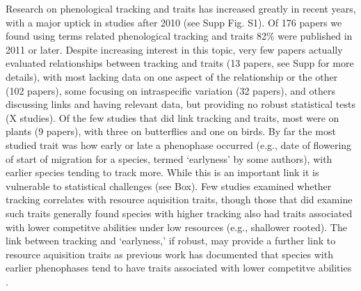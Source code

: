 \documentclass[11pt,letterpaper]{article}
\begin{document}
Research on phenological tracking and traits has increased greatly in recent years, with a major uptick in studies after 2010 (see Supp Fig. S1). Of 176 papers we found using terms related phenological tracking and traits 82\% were published in 2011 or later. Despite increasing interest in this topic, very few papers actually evaluated relationships between tracking and traits (13 papers, see Supp for more details), with most lacking data on one aspect of the relationship or the other (102 papers), some focusing on intraspecific variation (32 papers), and others discussing links and having relevant data, but providing no robust statistical tests (X studies). Of the few studies that did link tracking and traits, most were on plants (9 papers), with three on butterflies and one on birds. By far the most studied trait was how early or late a phenophase occurred (e.g., date of flowering of start of migration for a species, termed `earlyness' by some authors), with earlier species tending to track more. While this is an important link it is vulnerable to statistical challenges (see Box). Few studies examined whether tracking correlates with resource aquisition traits, though those that did examine such traits generally found species with higher tracking also had traits associated with lower competitve abilities under low resources (e.g., shallower rooted). The link between tracking and `earlyness,' if robust, may provide a further link to resource aquisition traits as previous work has documented that species with earlier phenophases tend to have traits associated with lower competitve abilities \citep[e.g., they tend to be of lower height, have shallower roots, narrower diameter vessels, thinner leaves, and grow faster,][]{wolkovich2014aob}. 
\end{document}
